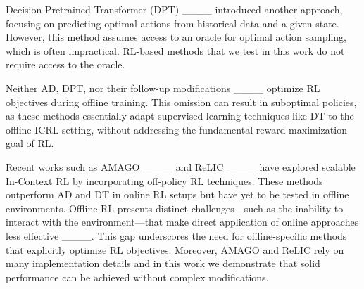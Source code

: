 Decision-Pretrained Transformer (DPT) ____ introduced another approach, focusing on predicting optimal actions from historical data and a given state. However, this method assumes access to an oracle for optimal action sampling, which is often impractical. RL-based methods that we test in this work do not require access to the oracle.

Neither AD, DPT, nor their follow-up modifications ____ optimize RL objectives during offline training. This omission can result in suboptimal policies, as these methods essentially adapt supervised learning techniques like DT to the offline ICRL setting, without addressing the fundamental reward maximization goal of RL.

Recent works such as AMAGO ____ and ReLIC ____ have explored scalable In-Context RL by incorporating off-policy RL techniques. These methods outperform AD and DT in online RL setups but have yet to be tested in offline environments. Offline RL presents distinct challenges—such as the inability to interact with the environment—that make direct application of online approaches less effective ____. This gap underscores the need for offline-specific methods that explicitly optimize RL objectives.  Moreover, AMAGO and ReLIC rely on many implementation details and in this work we demonstrate that solid performance can be achieved without complex modifications.